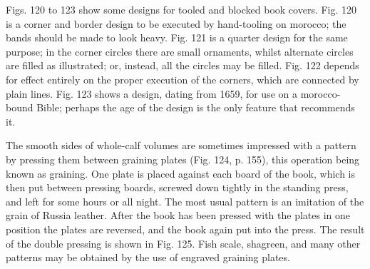 \documentclass[twoside]{book}
\begin{document}
Figs. 120 to 123 show some designs for tooled
and blocked book covers. Fig. 120 is a corner and
border design to be executed by hand-tooling on
morocco; the bands should be made to look heavy.
Fig. 121 is a quarter design for the same purpose;
in the corner circles there are small ornaments,
whilst alternate circles are filled as illustrated; or,
instead, all the circles may be filled. Fig. 122
depends for effect entirely on the proper execution
of the corners, which are connected by plain
lines. Fig. 123 shows a design, dating from 1659,
for use on a morocco-bound Bible; perhaps the age
of the design is the only feature that recommends it.

The smooth sides of whole-calf volumes are sometimes
impressed with a pattern by pressing them between
graining plates (Fig. 124, p. 155), this operation
being known as graining. One plate is placed
against each board of the book, which is then put
between pressing boards, screwed down tightly in
the standing press, and left for some hours or all
night. The most usual pattern is an imitation of
the grain of Russia leather. After the book has
been pressed with the plates in one position the
plates are reversed, and the book again put into the
press. The result of the double pressing is shown
in Fig. 125. Fish scale, shagreen, and many other
patterns may be obtained by the use of engraved
graining plates.
\end{document}
